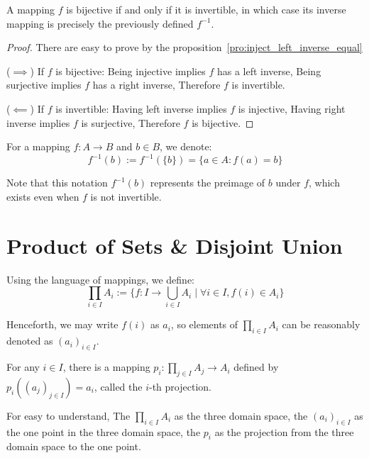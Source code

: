 \documentclass[11pt,lang=en]{elegantbook}
\begin{document}
\begin{proposition}
  A mapping $f$ is bijective if and only if it is invertible, in which case its inverse mapping is precisely the previously defined $f^{-1}$.
\end{proposition}

\begin{proof} There are easy to prove by the proposition~\ref{pro:inject_left_inverse_equal}

  ($\implies$) If $f$ is bijective: Being injective implies $f$ has a left inverse, Being surjective implies $f$ has a right inverse, Therefore $f$ is invertible.

  ($\impliedby$) If $f$ is invertible: Having left inverse implies $f$ is injective, Having right inverse implies $f$ is surjective, Therefore $f$ is bijective.
\end{proof}

\begin{definition}[Preimage]
  For a mapping $f : A \to B$ and $b \in B$, we denote:
  \[
    f^{-1}(b) := f^{-1}(\{b\}) = \{a \in A : f(a) = b\}
  \]
\end{definition}

\begin{remark}
  Note that this notation $f^{-1}(b)$ represents the preimage of $b$ under $f$, which exists even when $f$ is not invertible.
\end{remark}

\section{Product of Sets \& Disjoint Union}

\begin{definition}
  Using the language of mappings, we define:
  \[
    \prod_{i \in I} A_i := \{f : I \to \bigcup_{i \in I} A_i \mid \forall i \in I, f(i) \in A_i\}
  \]

  Henceforth, we may write $f(i)$ as $a_i$, so elements of $\prod_{i \in I} A_i$ can be reasonably denoted as $(a_i)_{i \in I}$.

  For any $i \in I$, there is a mapping $p_i : \prod_{j \in I} A_j \to A_i$ defined by $p_i((a_j)_{j \in I}) = a_i$, called the $i$-th projection.
\end{definition}

\begin{remark}
  For easy to understand, The $\prod_{i \in I} A_i$ as the three domain space, the $(a_i)_{i\in I}$ as the one point in the three domain space, the $p_i$ as the projection from the three domain space to the one point.
\end{remark}
\end{document}
